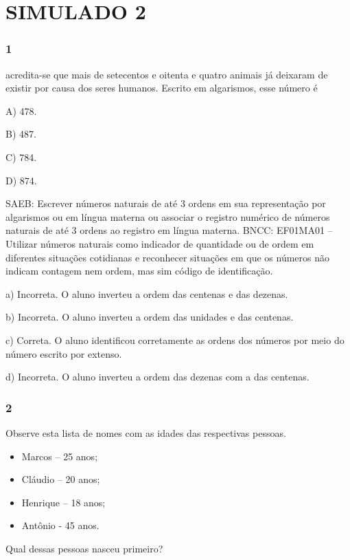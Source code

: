 \section{SIMULADO 2}\label{simulado-2}

\subsubsection{1}\label{section-102}

acredita-se que mais de setecentos e oitenta e quatro animais já
deixaram de existir por causa dos seres humanos. Escrito em algarismos, esse número é

A) 478.

B) 487.

C) 784.

D) 874.

SAEB: Escrever números naturais de até 3 ordens em sua
representação por algarismos ou em língua materna ou associar o registro
numérico de números naturais de até 3 ordens ao registro em língua
materna.
BNCC: EF01MA01 -- Utilizar números naturais como indicador de quantidade
ou de ordem em diferentes situações cotidianas e reconhecer situações em
que os números não indicam contagem nem ordem, mas sim código de
identificação.

a) Incorreta. O aluno inverteu a ordem das centenas e das dezenas.

b) Incorreta. O aluno inverteu a ordem das unidades e das centenas.

c) Correta. O aluno identificou corretamente as ordens dos números
por meio do número escrito por extenso.

d) Incorreta. O aluno inverteu a ordem das dezenas com a das centenas.

\subsubsection{2}\label{section-103}

Observe esta lista de nomes com as idades das respectivas pessoas.

\begin{itemize}
  \item Marcos -- 25 anos;
  \item Cláudio -- 20 anos;
  \item Henrique -- 18 anos;
  \item Antônio - 45 anos.
\end{itemize}

Qual dessas pessoas nasceu primeiro?

